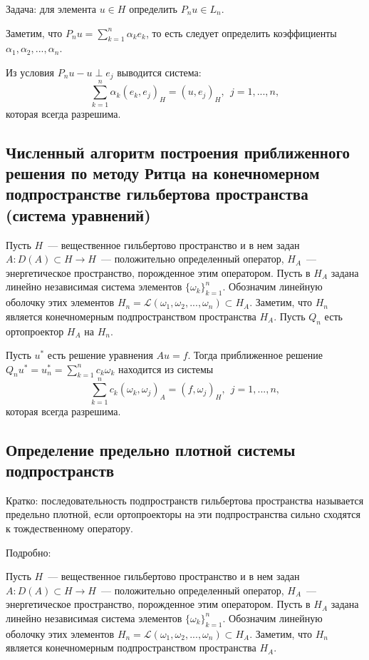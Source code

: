 \documentclass[a4paper,14pt]{article} %
\begin{document}
Задача: для элемента $u \in H$ определить $P_n u \in L_n$.

Заметим, что $P_n u = \sum_{k=1}^{n} \alpha_k e_k$,
то есть следует определить коэффициенты
$\alpha_1, \alpha_2 , ... , \alpha_n$.

Из условия $P_n u - u \perp e_j$ выводится система:
\begin{equation}
	\sum_{k=1}^{n} \alpha_k (e_k, e_j)_H = (u, e_j)_H, ~~ j=1,...,n
	,
\end{equation}
которая всегда разрешима.

\subsection{Численный алгоритм построения приближенного решения по методу Ритца на конечномерном подпространстве гильбертова пространства (система уравнений)}

Пусть $H$~--- вещественное гильбертово пространство и в нем задан
$A : D(A) \subset H \to H$~--- положительно определенный оператор,
$H_A$~--- энергетическое пространство, порожденное этим оператором.
Пусть в $H_A$ задана линейно независимая система элементов $\{\omega_k\}_{k=1}^n$.
Обозначим линейную оболочку этих элементов $H_n = \mathcal{L}(\omega_1, \omega_2 , ... , \omega_n ) \subset H_A$.
Заметим, что $H_n$ является конечномерным подпространством пространства $H_A$.
Пусть $Q_n$ есть ортопроектор $H_A$ на $H_n$.

Пусть $u^*$ есть решение уравнения $Au=f$.
Тогда приближенное решение $Q_n u^* = u^*_n = \sum_{k=1}^n c_k \omega_k$ находится из системы
\begin{equation}
	\sum_{k=1}^{n} c_k (\omega_k, \omega_j)_A = (f, \omega_j)_H, ~~ j=1,...,n
	,
\end{equation}
которая всегда разрешима.


\subsection{Определение предельно плотной системы подпространств}

Кратко: последовательность подпространств гильбертова пространства называется предельно плотной,
если ортопроекторы на эти подпространства сильно сходятся к тождественному оператору.

Подробно:

Пусть $H$~--- вещественное гильбертово пространство и в нем задан
$A : D(A) \subset H \to H$~--- положительно определенный оператор,
$H_A$~--- энергетическое пространство, порожденное этим оператором.
Пусть в $H_A$ задана линейно независимая система элементов $\{\omega_k\}_{k=1}^n$.
Обозначим линейную оболочку этих элементов $H_n = \mathcal{L}(\omega_1, \omega_2 , ... , \omega_n ) \subset H_A$.
Заметим, что $H_n$ является конечномерным подпространством пространства $H_A$.
\end{document}

